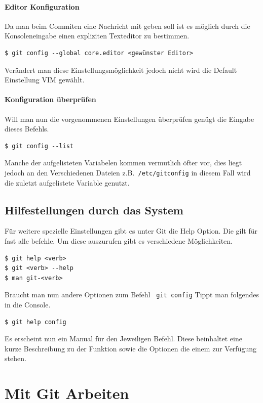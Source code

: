 \documentclass[12pt,a4paper,bibliography=totocnumbered,listof=totocnumbered]{scrartcl}
\begin{document}
\paragraph{Editor Konfiguration}
Da man beim Commiten eine Nachricht mit geben soll  ist es möglich durch die Konsoleneingabe  einen expliziten Texteditor zu bestimmen.
\begin{lstlisting}
$ git config --global core.editor <gewünster Editor>
 \end{lstlisting}
Verändert man diese Einstellungsmöglichkeit jedoch nicht wird die Default Einstellung VIM gewählt.

\paragraph{Konfiguration überprüfen}
Will man nun die vorgenommenen Einstellungen überprüfen genügt die Eingabe dieses Befehls.
\begin{lstlisting}
$ git config --list
\end{lstlisting}

Manche der aufgelisteten Variabelen kommen vermutlich öfter vor, dies liegt jedoch an den Verschiedenen Dateien z.B.\lstinline| /etc/gitconfig| in diesem Fall wird die zuletzt aufgelistete Variable genutzt.
\newpage
\subsection{Hilfestellungen durch das System}
Für weitere spezielle Einstellungen gibt es unter Git die Help Option.
Die gilt für fast alle befehle. Um diese auszurufen gibt es verschiedene Möglichkeiten.
\begin{lstlisting}
$ git help <verb>
$ git <verb> --help
$ man git-<verb>
\end{lstlisting} 

Braucht man nun andere Optionen zum Befehl \lstinline| git config| Tippt man folgendes in die Console.
\begin{lstlisting}
$ git help config
\end{lstlisting}
Es erscheint nun ein Manual für den Jeweiligen Befehl. Diese beinhaltet eine kurze Beschreibung zu der Funktion sowie die Optionen die einem zur Verfügung stehen.  
  






\section{Mit Git Arbeiten }
\end{document}
